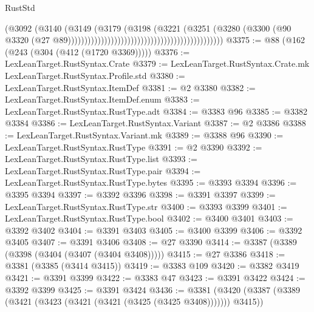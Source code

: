 \begin{lexlean}{RustStd}
\begin{coremodule}
                                                                            (@3092
                                                                              (@3140
                                                                                (@3149
                                                                                  (@3179
                                                                                    (@3198
                                                                                      (@3221
                                                                                        (@3251
                                                                                          (@3280
                                                                                            (@3300
                                                                                              (@90
                                                                                                @3320
                                                                                                (@27
                                                                                                  @89)))))))))))))))))))))))))))))))))))))))))))))))
@3375 := @88 (@162 (@243 (@304 (@412 (@1720 @3369)))))
@3376 := LexLeanTarget.RustSyntax.Crate
@3379 := LexLeanTarget.RustSyntax.Crate.mk LexLeanTarget.RustSyntax.Profile.std
@3380 := LexLeanTarget.RustSyntax.ItemDef
@3381 := @2 @3380
@3382 := LexLeanTarget.RustSyntax.ItemDef.enum
@3383 := LexLeanTarget.RustSyntax.RustType.adt
@3384 := @3383 @96
@3385 := @3382 @3384
@3386 := LexLeanTarget.RustSyntax.Variant
@3387 := @2 @3386
@3388 := LexLeanTarget.RustSyntax.Variant.mk
@3389 := @3388 @96
@3390 := LexLeanTarget.RustSyntax.RustType
@3391 := @2 @3390
@3392 := LexLeanTarget.RustSyntax.RustType.list
@3393 := LexLeanTarget.RustSyntax.RustType.pair
@3394 := LexLeanTarget.RustSyntax.RustType.bytes
@3395 := @3393 @3394
@3396 := @3395 @3394
@3397 := @3392 @3396
@3398 := @3391 @3397
@3399 := LexLeanTarget.RustSyntax.RustType.str
@3400 := @3393 @3399
@3401 := LexLeanTarget.RustSyntax.RustType.bool
@3402 := @3400 @3401
@3403 := @3392 @3402
@3404 := @3391 @3403
@3405 := @3400 @3399
@3406 := @3392 @3405
@3407 := @3391 @3406
@3408 := @27 @3390
@3414 := @3387 (@3389 (@3398 (@3404 (@3407 (@3404 @3408)))))
@3415 := @27 @3386
@3418 := @3381 (@3385 (@3414 @3415))
@3419 := @3383 @109
@3420 := @3382 @3419
@3421 := @3391 @3399
@3422 := @3383 @47
@3423 := @3391 @3422
@3424 := @3392 @3399
@3425 := @3391 @3424
@3436 := @3381 (@3420 (@3387 (@3389 (@3421 (@3423 (@3421 (@3421 (@3425 (@3425 @3408))))))) @3415))

\end{coremodule}
\end{lexlean}
